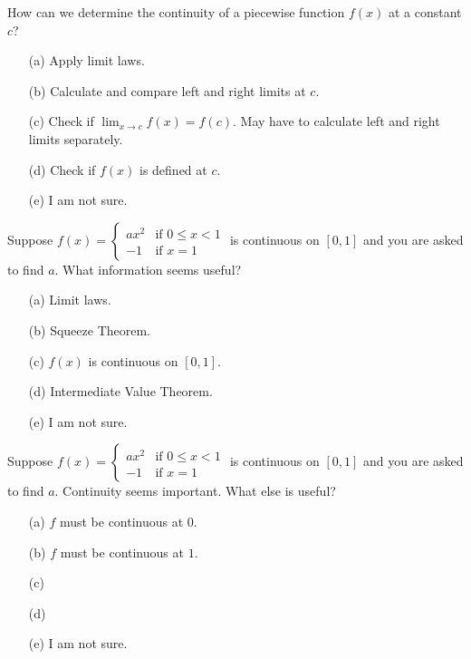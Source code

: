 \documentclass[14pt]{beamer}
\begin{document}
\begin{frame}[t]
  How can we determine the continuity of a piecewise function \(f(x)\) at a constant \(c\)?

  \medskip
  \begin{itemize} \setlength\itemsep{2ex}
    \item[(a)] Apply limit laws.
    \item[(b)] Calculate and compare left and right limits at \(c\).
    \item[(c)] Check if \(\lim_{x \to c}f(x) = f(c)\). May have to calculate left and right limits separately.
    \item[(d)] Check if \(f(x)\) is defined at \(c\).
    \item[(e)] I am not sure.
  \end{itemize} 
\end{frame}

\begin{frame}[t]
  Suppose \(f(x) = \begin{cases} ax^{2} &\text{if } 0 \le x < 1 \\ -1 &\text{if } x = 1 \end{cases}\) is continuous on \([0,1]\) and you are asked to find \(a\). What information seems useful?

  \medskip
  \begin{itemize} \setlength\itemsep{2ex}
    \item[(a)] Limit laws.
    \item[(b)] Squeeze Theorem.
    \item[(c)] \(f(x)\) is continuous on \([0,1]\).
    \item[(d)] Intermediate Value Theorem.
    \item[(e)] I am not sure.
  \end{itemize} 
\end{frame}

\begin{frame}[t]
  Suppose \(f(x) = \begin{cases} ax^{2} &\text{if } 0 \le x < 1 \\ -1 &\text{if } x = 1 \end{cases}\) is continuous on \([0,1]\) and you are asked to find \(a\). Continuity seems important. What else is useful?

  \medskip
  \begin{itemize} \setlength\itemsep{2ex}
    \item[(a)] \(f\) must be continuous at \(0\).
    \item[(b)] \(f\) must be continuous at \(1\).
    \item[(c)] 
    \item[(d)] 
    \item[(e)] I am not sure.
  \end{itemize} 
\end{frame}
\end{document}
